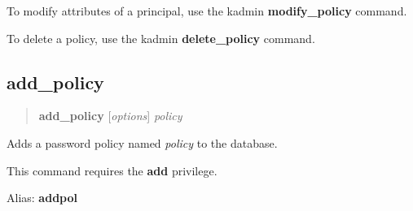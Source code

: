 \documentclass[letterpaper,10pt,english]{sphinxmanual}
\begin{document}
To modify attributes of a principal, use the kadmin \textbf{modify\_policy}
command.

To delete a policy, use the kadmin \textbf{delete\_policy} command.


\subsection{add\_policy}
\label{admin/database:add-policy}\begin{quote}

\textbf{add\_policy} {[}\emph{options}{]} \emph{policy}
\end{quote}

Adds a password policy named \emph{policy} to the database.

This command requires the \textbf{add} privilege.

Alias: \textbf{addpol}
\end{document}
